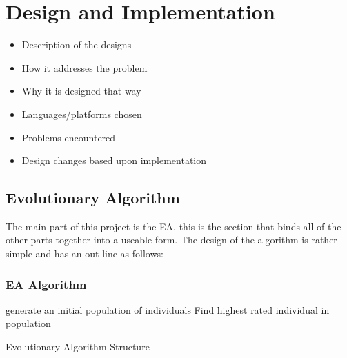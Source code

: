 \documentclass[a4paper]{article}
\begin{document}
\section{Design and Implementation}
\begin{itemize}
   \item Description of the designs
   \item How it addresses the problem
   \item Why it is designed that way
   \item Languages/platforms chosen
   \item Problems encountered
   \item Design changes based upon implementation
\end{itemize}
\par
\subsection{Evolutionary Algorithm}
\par
The main part of this project is the EA, this is the section that binds all of the other parts together into a useable form.
The design of the algorithm is rather simple and has an out line as follows:
\subsubsection{EA Algorithm}
\begin{algorithm}[H]
\SetAlgoLined{}
generate an initial population of individuals\;
Find highest rated individual in population\;
\caption{Evolutionary Algorithm Structure}
\end{algorithm}
\end{document}

